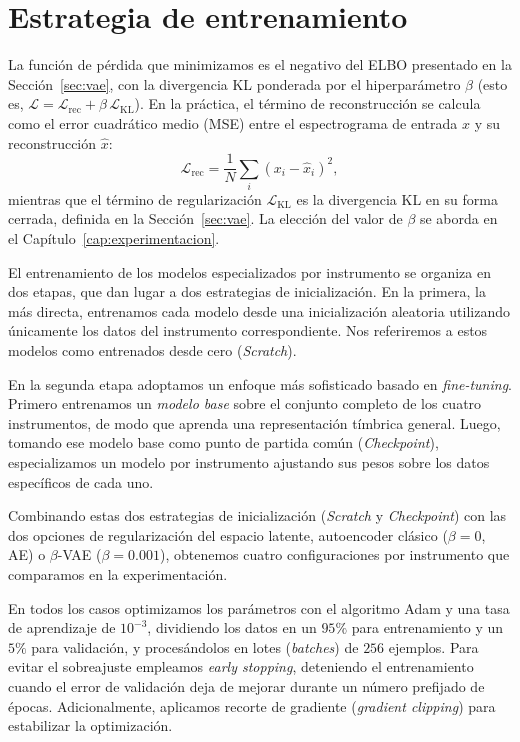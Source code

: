 \documentclass[12pt,a4paper,twoside]{tesis}
\begin{document}
\newpage
\section{Estrategia de entrenamiento}
\label{sec:entrenamiento}

La función de pérdida que minimizamos es el negativo del ELBO presentado en la Sección~\ref{sec:vae}, con la divergencia KL ponderada por el hiperparámetro $\beta$ (esto es, $\mathcal{L} = \mathcal{L}_{\mathrm{rec}} + \beta \, \mathcal{L}_{\mathrm{KL}}$). En la práctica, el término de reconstrucción se calcula como el error cuadrático medio (MSE) entre el espectrograma de entrada $x$ y su reconstrucción $\hat{x}$:
\begin{equation}
\mathcal{L}_{\mathrm{rec}} = \frac{1}{N}\sum_i (x_i - \hat{x}_i)^2,
\end{equation}
mientras que el término de regularización $\mathcal{L}_{\mathrm{KL}}$ es la divergencia KL en su forma cerrada, definida en la Sección~\ref{sec:vae}. La elección del valor de $\beta$ se aborda en el Capítulo~\ref{cap:experimentacion}.

El entrenamiento de los modelos especializados por instrumento se organiza en dos etapas, que dan lugar a dos estrategias de inicialización. En la primera, la más directa, entrenamos cada modelo desde una inicialización aleatoria utilizando únicamente los datos del instrumento correspondiente. Nos referiremos a estos modelos como entrenados desde cero (\textit{Scratch}).

En la segunda etapa adoptamos un enfoque más sofisticado basado en \textit{fine-tuning}. Primero entrenamos un \emph{modelo base} sobre el conjunto completo de los cuatro instrumentos, de modo que aprenda una representación tímbrica general. Luego, tomando ese modelo base como punto de partida común (\textit{Checkpoint}), especializamos un modelo por instrumento ajustando sus pesos sobre los datos específicos de cada uno.

Combinando estas dos estrategias de inicialización (\textit{Scratch} y \textit{Checkpoint}) con las dos opciones de regularización del espacio latente, autoencoder clásico ($\beta=0$, AE) o $\beta$-VAE ($\beta=0.001$), obtenemos cuatro configuraciones por instrumento que comparamos en la experimentación.

En todos los casos optimizamos los parámetros con el algoritmo Adam y una tasa de aprendizaje de $10^{-3}$, dividiendo los datos en un $95\%$ para entrenamiento y un $5\%$ para validación, y procesándolos en lotes (\textit{batches}) de $256$ ejemplos. Para evitar el sobreajuste empleamos \textit{early stopping}, deteniendo el entrenamiento cuando el error de validación deja de mejorar durante un número prefijado de épocas. Adicionalmente, aplicamos recorte de gradiente (\textit{gradient clipping}) para estabilizar la optimización.
\end{document}
